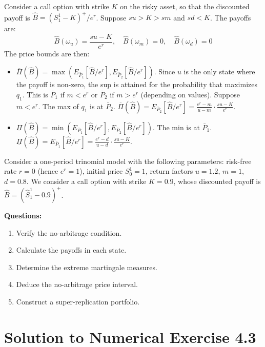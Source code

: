 \begin{example}
Consider a call option with strike $K$ on the risky asset, so that the discounted payoff is $\hat{B} = (S_1^1 - K)^+/e^r$. Suppose $su > K > sm$ and $sd < K$. The payoffs are:
\[
\hat{B}(\omega_u) = \frac{su-K}{e^r}, \quad \hat{B}(\omega_m) = 0, \quad \hat{B}(\omega_d) = 0
\]
The price bounds are then:
\begin{itemize}
    \item $\overline{\Pi}(\hat{B}) = \max(E_{\bar{P}_1}[\hat{B}/e^r], E_{\bar{P}_2}[\hat{B}/e^r])$.
    Since $u$ is the only state where the payoff is non-zero, the sup is attained for the probability that maximizes $q_1$. This is $\bar{P}_1$ if $m < e^r$ or $\bar{P}_2$ if $m > e^r$ (depending on values).
    Suppose $m < e^r$. The max of $q_1$ is at $\bar{P}_2$.
    $\overline{\Pi}(\hat{B}) = E_{\bar{P}_2}[\hat{B}/e^r] = \frac{e^r-m}{u-m} \cdot \frac{su-K}{e^r}$.
    \item $\underline{\Pi}(\hat{B}) = \min(E_{\bar{P}_1}[\hat{B}/e^r], E_{\bar{P}_2}[\hat{B}/e^r])$.
    The min is at $\bar{P}_1$.
    $\underline{\Pi}(\hat{B}) = E_{\bar{P}_1}[\hat{B}/e^r] = \frac{e^r-d}{u-d} \cdot \frac{su-K}{e^r}$.
\end{itemize}
\end{example}

\begin{example}
Consider a one-period trinomial model with the following parameters: risk-free rate $r=0$ (hence $e^r = 1$), initial price $S_0^1 = 1$, return factors $u=1.2$, $m=1$, $d=0.8$. We consider a call option with strike $K = 0.9$, whose discounted payoff is $\hat{B} = (\hat{S}^1_1 - 0.9)^+$.

\textbf{Questions:}
\begin{enumerate}
    \item Verify the no-arbitrage condition.
    \item Calculate the payoffs in each state.
    \item Determine the extreme martingale measures.
    \item Deduce the no-arbitrage price interval.
    \item Construct a super-replication portfolio.
\end{enumerate}
\end{example}

\section*{Solution to Numerical Exercise 4.3}

